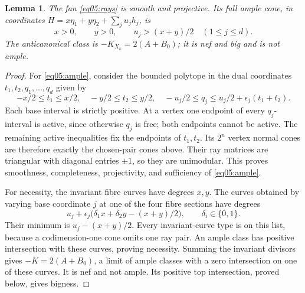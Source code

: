 \documentclass[11pt]{amsart}
\newtheorem{lemma}[theorem]{Lemma}
\theoremstyle{definition}
\theoremstyle{remark}
\begin{document}
\begin{lemma}\label{lem05:ample}
The fan \eqref{eq05:rays} is smooth and projective. Its full ample
cone, in coordinates \(H=x\eta_1+y\eta_2+\sum_ju_jh_j\), is
\begin{equation}\label{eq05:ample}
 x>0,\qquad y>0,\qquad u_j>(x+y)/2\quad(1\le j\le d).
\end{equation}
The anticanonical class is \(-K_{X_k}=2(A+B_0)\); it is nef and big
and is not ample.
\end{lemma}

\begin{proof}
For \eqref{eq05:ample}, consider the bounded polytope in the dual
coordinates \(t_1,t_2,q_1,\ldots,q_d\) given by
\begin{equation}\label{eq05:polytope}
 -x/2\le t_1\le x/2,\quad -y/2\le t_2\le y/2,\quad
 -u_j/2\le q_j\le u_j/2+\epsilon_j(t_1+t_2).
\end{equation}
Each base interval is strictly positive. At a vertex one endpoint
of every \(q_j\)-interval is active, since otherwise \(q_j\) is
free; both endpoints cannot be active. The remaining active
inequalities fix the endpoints of \(t_1,t_2\). Its \(2^n\) vertex
normal cones are therefore exactly the chosen-pair cones above.
Their ray matrices are triangular with diagonal entries \(\pm1\),
so they are unimodular. This proves smoothness, completeness,
projectivity, and sufficiency of \eqref{eq05:ample}.

For necessity, the invariant fibre curves have degrees \(x,y\).
The curves obtained by varying base coordinate \(j\) at one of
the four fibre sections have degrees
\[
 u_j+\epsilon_j\bigl(\delta_1x+\delta_2y-(x+y)/2\bigr),
 \qquad \delta_i\in\{0,1\}.
\]
Their minimum is \(u_j-(x+y)/2\). Every invariant-curve type is
on this list, because a codimension-one cone omits one ray pair.
An ample class has positive intersection with these curves, proving
necessity. Summing the invariant divisors gives
\(-K=2(A+B_0)\), a limit of ample classes with a zero intersection
on one of these curves. It is nef and not ample. Its positive top
intersection, proved below, gives bigness.
\end{proof}
\end{document}
